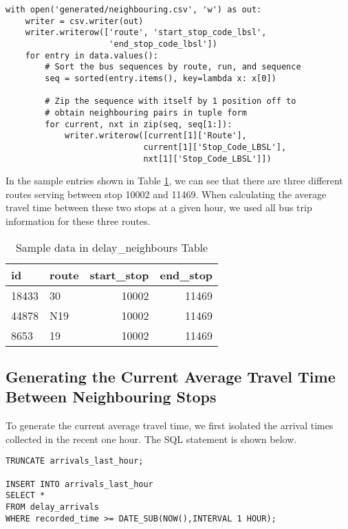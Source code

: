 \begin{verbatim}
with open('generated/neighbouring.csv', 'w') as out:
    writer = csv.writer(out)
    writer.writerow(['route', 'start_stop_code_lbsl',
                     'end_stop_code_lbsl'])
    for entry in data.values():
        # Sort the bus sequences by route, run, and sequence
        seq = sorted(entry.items(), key=lambda x: x[0])

        # Zip the sequence with itself by 1 position off to
        # obtain neighbouring pairs in tuple form
        for current, nxt in zip(seq, seq[1:]):
            writer.writerow([current[1]['Route'],
                            current[1]['Stop_Code_LBSL'],
                            nxt[1]['Stop_Code_LBSL']])
\end{verbatim}

\par In the sample entries shown in Table \ref{table:sample_neighbours_view}, we can see that there are three different routes serving between stop 10002 and 11469. When calculating the average travel time between these two stops at a given hour, we used all bus trip information for these three routes.

\begin{table}
\centering
\begin{tabular}{@{}llrr@{}} \toprule
id & route & start\_stop & end\_stop \\ \midrule
18433 & 30 & 10002 & 11469 \\
44878 & N19 & 10002 & 11469 \\
8653 & 19 & 10002 & 11469 \\ \bottomrule
\end{tabular}
\caption{Sample data in delay\_neighbours Table}
\label{table:sample_neighbours_view}
\end{table}

\subsection{Generating the Current Average Travel Time Between Neighbouring Stops}
\par To generate the current average travel time, we first isolated the arrival times collected in the recent one hour. The SQL statement is shown below.

\begin{verbatim}
TRUNCATE arrivals_last_hour;

INSERT INTO arrivals_last_hour
SELECT *
FROM delay_arrivals
WHERE recorded_time >= DATE_SUB(NOW(),INTERVAL 1 HOUR);
\end{verbatim}

